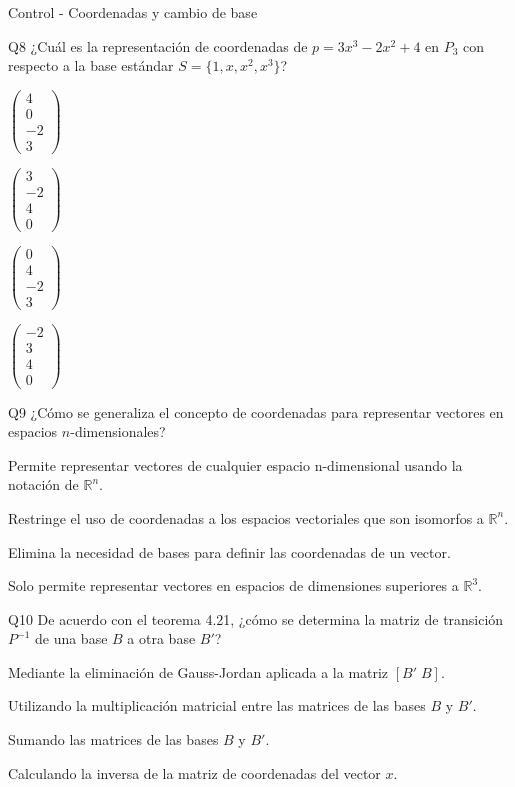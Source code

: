 \documentclass[a4,11pt]{aleph-notas}
\begin{document}
\begin{quiz}{Control - Coordenadas y cambio de base}
\begin{multi}[]{Q8}
    ¿Cuál es la representación de coordenadas de $p = 3x^3 - 2x^2 + 4$ en $P_3$ con respecto a la base estándar $S = \{1, x, x^2, x^3\}$?
    \item* $\begin{pmatrix} 4 \\ 0 \\ -2 \\ 3 \end{pmatrix}$
    \item $\begin{pmatrix} 3 \\ -2 \\ 4 \\ 0 \end{pmatrix}$
    \item $\begin{pmatrix} 0 \\ 4 \\ -2 \\ 3 \end{pmatrix}$
    \item $\begin{pmatrix} -2 \\ 3 \\ 4 \\ 0 \end{pmatrix}$
\end{multi}

\begin{multi}[]{Q9}
    ¿Cómo se generaliza el concepto de coordenadas para representar vectores en espacios $n$-dimensionales?
    \item* Permite representar vectores de cualquier espacio n-dimensional usando la notación de $\mathbb{R}^n$.
    \item Restringe el uso de coordenadas a los espacios vectoriales que son isomorfos a $\mathbb{R}^n$.
    \item Elimina la necesidad de bases para definir las coordenadas de un vector.
    \item Solo permite representar vectores en espacios de dimensiones superiores a $\mathbb{R}^3$.
\end{multi}

\begin{multi}[]{Q10}
    De acuerdo con el teorema 4.21, ¿cómo se determina la matriz de transición $P^{-1}$ de una base $B$ a otra base $B'$?
    \item* Mediante la eliminación de Gauss-Jordan aplicada a la matriz $[B' \; B]$.
    \item Utilizando la multiplicación matricial entre las matrices de las bases $B$ y $B'$.
    \item Sumando las matrices de las bases $B$ y $B'$.
    \item Calculando la inversa de la matriz de coordenadas del vector $x$.
\end{multi}


\end{quiz}
\end{document}
